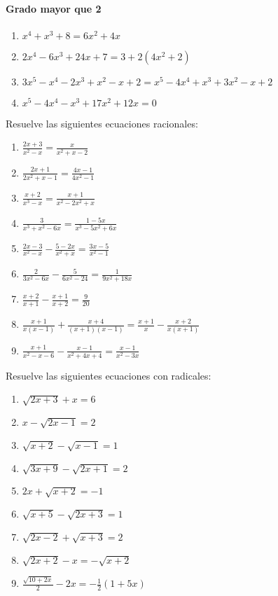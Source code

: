 \paragraph{Grado mayor que 2}
\begin{enumerate}[topsep=0pt]
	\item $x^4+x^3+8 = 6x^2 + 4x$
	\item $2x^4-6x^3+24x + 7 = 3 + 2 (4x^2 + 2)$
	\item $3x^5 - x^4 -2x^3 + x^2 - x +2 = x^5-4x^4 +x^3 + 3x^2- x +2$
	\item $x^5-4x^4-x^3+17x^2+12x = 0$
\end{enumerate}

\Exercicio Resuelve las siguientes ecuaciones racionales:

\begin{enumerate}[topsep=0pt]
	\item $ \frac{2x+3}{x^2-x} = \frac{x}{x^2 + x -2} $
	\item $ \frac{2x+1}{2x^2 +x - 1} = \frac{4x-1}{4x^2-1} $
	\item $ \frac{x+2}{x^3-x} = \frac{x+1}{x^2-2x^2+x} $
	\item $ \frac{3}{x^3+x^2-6x} = \frac{1-5x}{x^3-5x^2+6x} $
	\item $ \frac{2x-3}{x^2-x} - \frac{5-2x}{x^2+x} = \frac{3x-5}{x^2-1} $
	\item $ \frac{2}{3x^2-6x}-\frac{5}{6x^2-24} = \frac{1}{9x^2+18x}$
	\item $ \frac{x+2}{x+1} - \frac{x+1}{x+2} = \frac{9}{20}$
	\item $ \frac{x+1}{x(x-1)} + \frac{x+4}{(x+1)(x-1)} = \frac{x+1}{x} - \frac{x+2}{x(x+1)}$
	\item $ \frac{x+1}{x^2-x-6} - \frac{x-1}{x^2+4x+4} = \frac{x-1}{x^2-3x}$
\end{enumerate}


\Exercicio Resuelve las siguientes ecuaciones con radicales:
\begin{enumerate}[topsep=0pt]
	\item $ \sqrt{2x+3} + x = 6 $
	\item $ x - \sqrt{2x-1} = 2 $
	\item $ \sqrt{x+2} - \sqrt{x-1} = 1 $
	\item $ \sqrt{3x + 9} - \sqrt{2x+1} = 2 $
	\item $ 2x + \sqrt{x+2} = -1$
	\item $ \sqrt{x+5} - \sqrt{2x+3} = 1$
	\item $ \sqrt{2x-2} + \sqrt{x+3} = 2$
	\item $ \sqrt{2x+2} -x = -\sqrt{x+2}$
	\item $ \frac{\sqrt{10+2x}}{2} - 2x = - \frac{1}{2}(1+5x)$
\end{enumerate}


